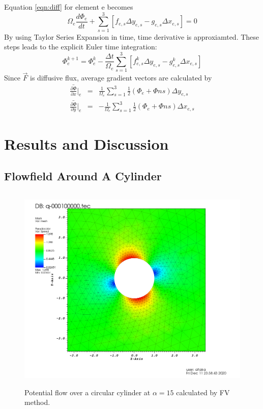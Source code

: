 \documentclass[letterpaper,12pt]{article}
\begin{document}
Equation \ref{eqn:diff} for element e becomes
\begin{equation}
        \Omega_e \frac{d\Phi_e}{dt} +\sum_{s=1}^{3} [f_{e,s}\Delta y_{e,s}-g_{e,s}\Delta x_{e,s}]=0
\end{equation}
By using Taylor Series Expansion in time, time derivative is approxiamted. These steps leads to the explicit Euler time
integration:
\begin{equation}
        \Phi_{e}^{k+1} =\Phi_{e}^{k} - \frac{\Delta t}{\Omega_e}\sum_{s=1}^{3}[f_{e,s}^{k}\Delta y_{e,s}-g_{e,s}^{k}\Delta x_{e,s}]
\end{equation}
Since $\vec{F}$ is diffusive flux, average gradient vectors are calculated by
\begin{eqnarray}
\bar{\frac{\partial \Phi}{\partial x}}\bigg|_{e}&=&\frac{1}{\Omega_e}\sum_{s=1}^{3}\frac{1}{2}(\Phi_e+\Phi{ns})\Delta y_{e,s} \nonumber \\
\bar{\frac{\partial \Phi}{\partial y}}\bigg|_{e}&=&-\frac{1}{\Omega_e}\sum_{s=1}^{3}\frac{1}{2}(\Phi_e+\Phi{ns})\Delta x_{e,s}	\nonumber
\end{eqnarray}
\newpage

\section{Results and Discussion}

\subsection{Flowfield Around A Cylinder}

\begin{figure} [ht]
	\centering
	\includegraphics[height = 10cm]{graph/15deg/Cylinder_15angle_speed0001.png}
	\caption{Potential flow over a circular cylinder at $\alpha=15$ calculated by FV method.}
    \label{fig:q1p}
\end{figure}
\end{document}
